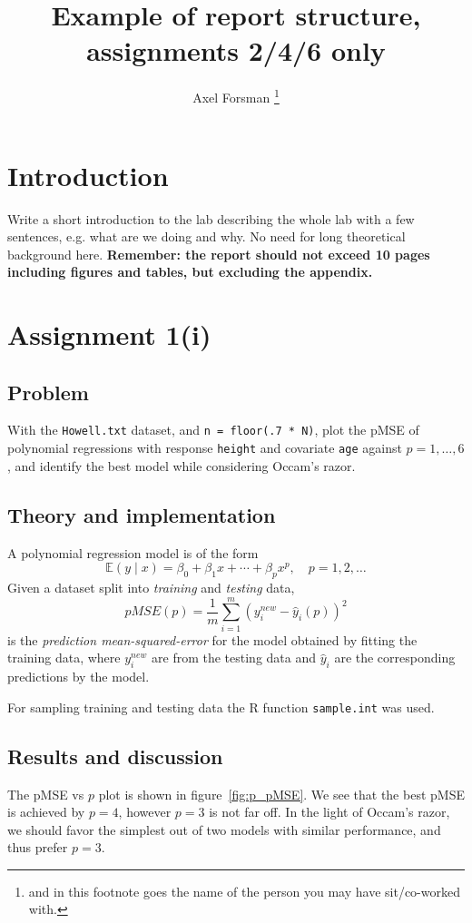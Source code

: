\documentclass[11pt, a4paper]{article}
\title{Example of report structure, assignments 2/4/6 only}
\author{Axel Forsman \footnote{and in this footnote goes the name of the person you may have sit/co-worked with.}}
\begin{document}
\maketitle

\section{Introduction}
Write a short introduction to the lab describing the whole lab with a few sentences, e.g. what are we doing and why. No need for long theoretical background here. \textbf{Remember: the report should not exceed 10 pages including figures and tables, but excluding the appendix.}

\section{Assignment 1(i)}
\subsection{Problem}
With the \verb|Howell.txt| dataset, and \verb|n = floor(.7 * N)|,
plot the pMSE of polynomial regressions with response \texttt{height} and covariate \texttt{age}
against $p = 1, \ldots, 6$,
and identify the best model while considering Occam's razor.

\subsection{Theory and implementation}
A polynomial regression model is of the form
$$ \mathbb E(y \mid x) = \beta_0 + \beta_1 x + \cdots + \beta_p x^p, \quad p = 1, 2, \ldots $$
Given a dataset split into \emph{training} and \emph{testing} data,
$$ pMSE(p) = \frac1m \sum^m_{i=1} \left(y_i^{new} - \hat y_i(p)\right)^2$$
is the \emph{prediction mean-squared-error} for the model
obtained by fitting the training data,
where $y_i^{new}$ are from the testing data and
$\hat y_i$ are the corresponding predictions by the model.

For sampling training and testing data the R function \texttt{sample.int} was used.

\subsection{Results and discussion}
The pMSE vs $p$ plot is shown in figure~\ref{fig:p_pMSE}.
We see that the best pMSE is achieved by $p=4$, however $p=3$ is not far off.
In the light of Occam's razor,
we should favor the simplest out of two models with similar performance,
and thus prefer $p=3$.
\end{document}
